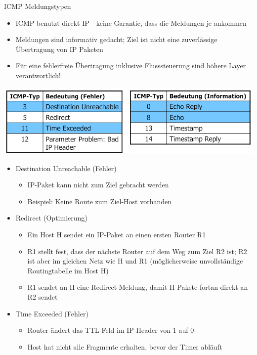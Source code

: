 \begin{definition}{ICMP Meldungstypen}
    \begin{itemize}
        \item ICMP benutzt direkt IP - keine Garantie, dass die Meldungen je ankommen
        \item Meldungen sind informativ gedacht; Ziel ist nicht eine zuverlässige Übertragung von IP Paketen
        \item Für eine fehlerfreie Übertragung inklusive Flusssteuerung sind höhere Layer verantwortlich!
    \end{itemize}
        \includegraphics[width=0.75\linewidth]{images/icmp_medlungstypen.png}
    \begin{itemize}
        \item Destination Unreachable (Fehler)
        \begin{itemize}
            \item IP-Paket kann nicht zum Ziel gebracht werden
            \item Beispiel: Keine Route zum Ziel-Host vorhanden
        \end{itemize}
        \item Redirect (Optimierung)
        \begin{itemize}
            \item Ein Host H sendet ein IP-Paket an einen ersten Router R1
            \item R1 stellt fest, dass der nächste Router auf dem Weg zum Ziel R2 ist; R2 ist aber im gleichen Netz wie H und R1 (möglicherweise unvollständige Routingtabelle im Host H)
            \item R1 sendet an H eine Redirect-Meldung, damit H Pakete fortan direkt an R2 sendet
        \end{itemize}
        \item Time Exceeded (Fehler)
        \begin{itemize}
            \item Router ändert das TTL-Feld im IP-Header von 1 auf 0
            \item Host hat nicht alle Fragmente erhalten, bevor der Timer abläuft
        \end{itemize}

\end{itemize}
\end{definition}

